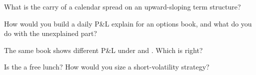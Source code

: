 \begin{interviewq}\label{iq:dv:trading-volatility:3}
What is the carry of a calendar spread on an upward-sloping term structure?
\end{interviewq}

\begin{interviewq}\label{iq:dv:trading-volatility:4}
How would you build a daily P\&L explain for an options book, and what do you do with the unexplained part?
\end{interviewq}

\begin{interviewq}\label{iq:dv:trading-volatility:5}
The same book shows different  P\&L under  and . Which is right?
\end{interviewq}

\begin{interviewq}\label{iq:dv:trading-volatility:6}
Is the  a free lunch? How would you size a short-volatility strategy?
\end{interviewq}

